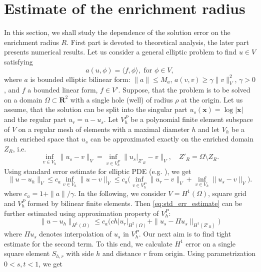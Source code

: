 \documentclass{elsarticle}
\def\vc#1{\mathbf{\boldsymbol{#1}}}     %
\def\abs#1{\left|#1\right|}
\def\norm#1{\| #1 \|}
\def\abs#1{| #1 |}
\newcommand{\R}{\mathbf{R}}
\begin{document}
\section{Estimate of the enrichment radius} \label{sec:enrichemnt_radius}
In this section, we shall study the dependence of the solution error on the enrichment radius $R$. First part is devoted to 
theoretical analysis, the later part presents numerical results.
Let us consider a general elliptic problem to find $u\in V$ satisfying
\[
   a(u, \phi) = \langle f, \phi \rangle, \text{ for } \phi \in V,
\]
where $a$ is bounded elliptic bilinear form: $\norm{a}\le M_a$, $a(v, v) \ge \gamma \norm{v}_V^2$, $\gamma>0$, and $f$ a bounded linear form, $f\in V'$. 
Suppose, that the problem is to be solved on a domain $\Omega \subset \R^2$ with a single hole (well) of radius $\rho$ at the origin. 
Let us assume, that the solution can be split into the singular part $u_s(\vc x)= \log |\vc x|$ and the regular part $u_r=u-u_s$.
Let $V^P_h$ be a polynomial finite element subspace of $V$ on a regular mesh of elements with a maximal diameter $h$
and let $V_h$ be a such enriched space that $u_s$ can be approximated exactly on the enriched domain $Z_R$, i.e.
\[
   \inf_{v\in V_h} \norm{u_s - v}_V = \inf_{v\in V^P_h} \norm{u_s|_{Z'_R} - v}_V, \quad Z'_R = \Omega\setminus Z_R.
\]
Using standard error estimate for elliptic PDE (e.g. \cite[Theorem 13.1]{ciarlet_basic_1991}), we get
\begin{equation}
    \label{eq:std_err_estimate}
    \norm{u - u_h}_{V} \le c_a \inf_{v \in V_h} \norm{u - v}_{V} 
    \le c_a \big(\inf_{v \in V^P_h} \norm{u_r - v}_{V} + \inf_{v \in V_h} \norm{u_s - v}_{V} \big).   
\end{equation}
where $c_a=1+\norm{a}/\gamma$.
In the following, we consider $V=H^1(\Omega)$, square grid and $V^P_h$ formed by bilinear finite elements. 
Then \eqref{eq:std_err_estimate} can be further estimated using approximation property of $V^P_h$:
\begin{equation}
    \label{eq:particular_estimate}
    \norm{u - u_h}_{H^1(\Omega)} \le c_a \big(c h \abs{u_r}_{H^2(\Omega)} + \norm{u_s - \Pi u_s}_{H^1(Z'_R)} \big)   
\end{equation}
where $\Pi u_s$ denotes interpolation of $u_s$ in $V^P_h$. Our next aim is to find tight estimate for the second term.
To this end, we calculate $H^1$ error on a single square element $S_{h,r}$ with side $h$ and distance $r$ from origin.
Using parametrization $0<s,t<1$,  we get
\end{document}
